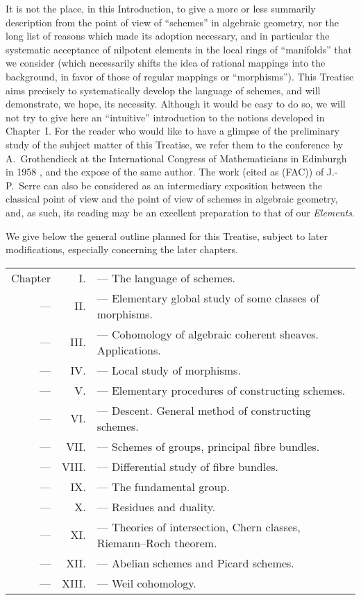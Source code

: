 \documentclass[10pt,oneside]{book}
\begin{document}
It is not the place, in this Introduction, to give a more or less summarily
description from the point of view of ``schemes'' in algebraic geometry, nor the
long list of reasons which made its adoption necessary, and in particular the
systematic acceptance of nilpotent elements in the local rings of ``manifolds''
that we consider (which necessarily shifts the idea of rational mappings into
the background, in favor of those of regular mappings or ``morphisms''). This
Treatise aims precisely to systematically develop the language of schemes, and
will demonstrate, we hope, its necessity. Although it would be easy to do so,
we will not try to give here an ``intuitive'' introduction to the
notions developed in Chapter~I. For the reader who would like to have a glimpse
of the preliminary study of the subject matter of this Treatise, we refer them
to the conference by A.~Grothendieck at the International Congress of
Mathematicians in Edinburgh in 1958 \cite{7}, and the expose \cite{8} of the
same author. The work \cite{14} (cited as (FAC)) of J.-P.~Serre can also be
considered as an intermediary exposition between the classical point of view and
the point of view of schemes in algebraic geometry, and, as such, its reading
may be an excellent preparation to that of our \emph{Elements}.

\asttri

We give below the general outline planned for this Treatise, subject to later
modifications, especially concerning the later chapters.

\begin{tabular}{rrl}
Chapter & I. & --- The language of schemes.\\
--- & II. & --- Elementary global study of some classes of morphisms.\\
--- & III. & --- Cohomology of algebraic coherent sheaves. Applications.\\
--- & IV. & --- Local study of morphisms.\\
--- & V. & --- Elementary procedures of constructing schemes.\\
--- & VI. & --- Descent. General method of constructing schemes.\\
--- & VII. & --- Schemes of groups, principal fibre bundles.\\
--- & VIII. & --- Differential study of fibre bundles.\\
--- & IX. & --- The fundamental group.\\
--- & X. & --- Residues and duality.\\
--- & XI. & --- Theories of intersection, Chern classes, Riemann--Roch theorem.\\
--- & XII. & --- Abelian schemes and Picard schemes.\\
--- & XIII. & --- Weil cohomology.
\end{tabular}\\
\end{document}
